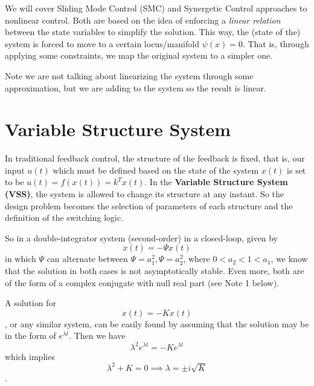 
We will cover Sliding Mode Control (SMC) and Synergetic Control approaches to nonlinear control. Both are based on the idea of enforcing a \emph{linear relation} between the state variables to simplify the solution. This way, the (state of the) system is forced to move to a certain locus/manifold $\psi(x)=0$. That is, through applying some constraints, we map the original system to a simpler one.

Note we are not talking about linearizing the system through some approximation, but we are adding to the system so the result is linear.

\section*{Variable Structure System}

In traditional feedback control, the structure of the feedback is fixed, that is, our input $u(t)$ which must be defined based on the state of the system $x(t)$ is set to be $u(t)=f\left( x(t) \right) =k^{T}x(t)$. In the \textbf{Variable Structure System (VSS)}, the system is allowed to change its structure at any instant. So the design problem becomes the selection of parameters of each structure and the definition of the switching logic.

So in a double-integrator system (second-order) in a closed-loop, given by \[
    \ddot{x}(t)=-\Psi x(t)
\] in which $\Psi$ can alternate between $\Psi=a_1^{2},\Psi=a_2^{2}$, where $0<a_2<1<a_1$, we know that the solution in both cases is not asymptotically stable. Even more, both are of the form of a complex conjugate with null real part (see Note 1 below).

\begin{note}
    A solution for \[
    \ddot{x}(t) = -K x(t)
    \] , or any similar system, can be easily found by assuming that the solution may be in the form of $e^{\lambda t}$. Then we have \[
    \lambda^{2}e^{\lambda t} = -K e^{\lambda t}
    \] which implies \[
    \lambda^{2}+K = 0 \implies \lambda = \pm i\sqrt{K}
    \].
\end{note}

